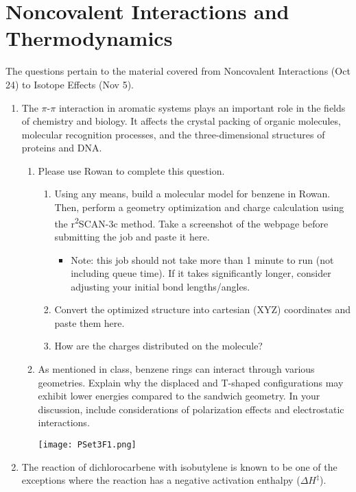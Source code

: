 \documentclass[../psets.tex]{subfiles}
\begin{document}
\section{Noncovalent Interactions and Thermodynamics}
The questions pertain to the material covered from Noncovalent Interactions (Oct 24) to Isotope Effects (Nov 5).
\begin{enumerate}
    \item The $\pi$-$\pi$ interaction in aromatic systems plays an important role in the fields of chemistry and biology. It affects the crystal packing of organic molecules, molecular recognition processes, and the three-dimensional structures of proteins and DNA.
    \begin{enumerate}
        \item Please use Rowan to complete this question.
        \begin{enumerate}
            \item Using any means, build a molecular model for benzene in Rowan. Then, perform a geometry optimization and charge calculation using the r\textsuperscript{2}SCAN-3c method. Take a screenshot of the webpage before submitting the job and paste it here.
            \begin{itemize}
                \item Note: this job should not take more than 1 minute to run (not including queue time). If
                it takes significantly longer, consider adjusting your initial bond lengths/angles.
            \end{itemize}
            \item Convert the optimized structure into cartesian (XYZ) coordinates and paste them here.
            \item How are the charges distributed on the molecule?
        \end{enumerate}
        \item As mentioned in class, benzene rings can interact through various geometries. Explain why the displaced and T-shaped configurations may exhibit lower energies compared to the sandwich geometry. In your discussion, include considerations of polarization effects and electrostatic interactions.
        \begin{center}
            \texttt{[image: PSet3F1.png]}
        \end{center}
    \end{enumerate}
    \pagebreak
    \item The reaction of dichlorocarbene with isobutylene is known to be one of the exceptions where the reaction has a negative activation enthalpy ($\Delta H^\ddagger$).

\end{enumerate}
\end{document}
